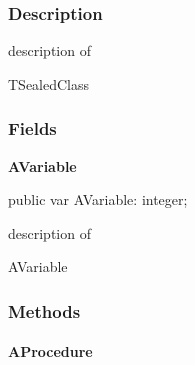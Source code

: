 \documentclass{report}
\newif\ifpdf
\begin{document}
\subsubsection*{\large{\textbf{Description}}\normalsize\hspace{1ex}\hfill}
description of \begin{ttfamily}TSealedClass\end{ttfamily}\subsubsection*{\large{\textbf{Fields}}\normalsize\hspace{1ex}\hfill}
\begin{list}{}{
\setlength{\itemindent}{0cm}
\setlength{\listparindent}{0cm}
\setlength{\leftmargin}{\evensidemargin}
\addtolength{\leftmargin}{\tmplength}
\settowidth{\labelsep}{X}
\addtolength{\leftmargin}{\labelsep}
\setlength{\labelwidth}{\tmplength}
}
\label{ok_abstract_sealed.TSealedClass-AVariable}
\item[\textbf{AVariable}\hfill]
\ifpdf
\begin{flushleft}
\fi
\begin{ttfamily}
public var AVariable: integer;\end{ttfamily}

\ifpdf
\end{flushleft}
\fi


\par description of \begin{ttfamily}AVariable\end{ttfamily}\end{list}
\subsubsection*{\large{\textbf{Methods}}\normalsize\hspace{1ex}\hfill}
\paragraph*{AProcedure}\hspace*{\fill}
\end{document}
